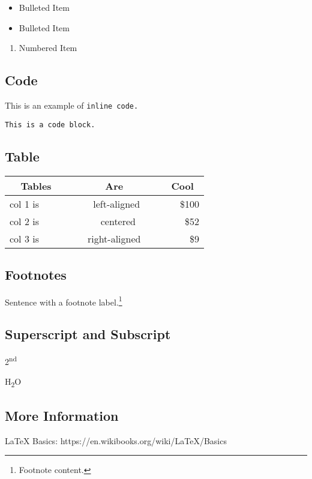 \begin{itemize}
\item
  Bulleted Item\\
\item
  Bulleted Item\\
\end{itemize}

\begin{enumerate}
\def\labelenumi{\arabic{enumi}.}
\setcounter{enumi}{1}
\item
  Numbered Item
\end{enumerate}

\subsection{Code}

This is an example of \texttt{inline\ code.}

\texttt{This\ is\ a\ code\ block.}

\subsection{Table}

\begin{longtable}[]{@{}lcr@{}}
\toprule
~~Tables~~ & ~~~~~~Are~~~~~~ & ~Cool~\tabularnewline
\midrule
\endhead
col 1 is & ~left-aligned & \$100\tabularnewline
col 2 is & ~~~ centered~~ & ~\$52\tabularnewline
col 3 is & right-aligned & ~~\$9\tabularnewline
\bottomrule
\end{longtable}

\subsection{Footnotes}

Sentence with a footnote label.\footnote{Footnote content.}

\subsection{Superscript and Subscript}

2\textsuperscript{nd}

H\textsubscript{2}O

\subsection{More Information}

LaTeX Basics: https://en.wikibooks.org/wiki/LaTeX/Basics
